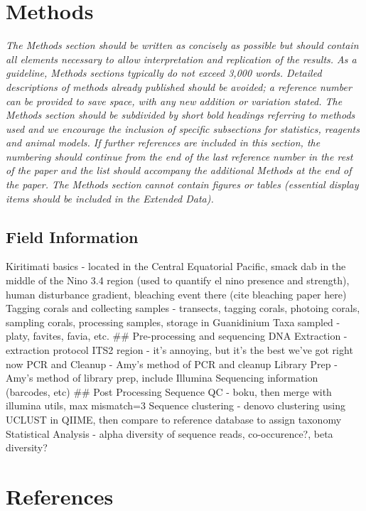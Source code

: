 \documentclass[]{article}
\begin{document}
\section{Methods}\label{methods}

\emph{The Methods section should be written as concisely as possible but
should contain all elements necessary to allow interpretation and
replication of the results. As a guideline, Methods sections typically
do not exceed 3,000 words. Detailed descriptions of methods already
published should be avoided; a reference number can be provided to save
space, with any new addition or variation stated. The Methods section
should be subdivided by short bold headings referring to methods used
and we encourage the inclusion of specific subsections for statistics,
reagents and animal models. If further references are included in this
section, the numbering should continue from the end of the last
reference number in the rest of the paper and the list should accompany
the additional Methods at the end of the paper. The Methods section
cannot contain figures or tables (essential display items should be
included in the Extended Data).}

\subsection{Field Information}\label{field-information}

Kiritimati basics - located in the Central Equatorial Pacific, smack dab
in the middle of the Nino 3.4 region (used to quantify el nino presence
and strength), human disturbance gradient, bleaching event there (cite
bleaching paper here) Tagging corals and collecting samples - transects,
tagging corals, photoing corals, sampling corals, processing samples,
storage in Guanidinium Taxa sampled - platy, favites, favia, etc. \#\#
Pre-processing and sequencing DNA Extraction - extraction protocol ITS2
region - it's annoying, but it's the best we've got right now PCR and
Cleanup - Amy's method of PCR and cleanup Library Prep - Amy's method of
library prep, include Illumina Sequencing information (barcodes, etc)
\#\# Post Processing Sequence QC - boku, then merge with illumina utils,
max mismatch=3 Sequence clustering - denovo clustering using UCLUST in
QIIME, then compare to reference database to assign taxonomy Statistical
Analysis - alpha diversity of sequence reads, co-occurence?, beta
diversity?

\section{References}\label{references}
\end{document}
